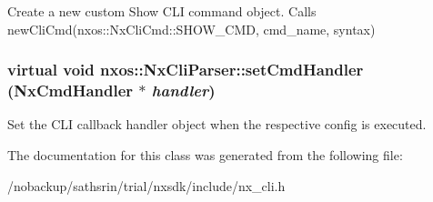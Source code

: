 \label{classnxos_1_1NxCliParser_ac07fa22d7d83d4c9015ea1f3976163d8}
Create a new custom Show CLI command object. Calls newCliCmd(nxos::NxCliCmd::SHOW\_\-CMD, cmd\_\-name, syntax) \hypertarget{classnxos_1_1NxCliParser_a711e36619a40625ebf62b59693529d88}{
\subsubsection[{setCmdHandler}]{\setlength{\rightskip}{0pt plus 5cm}virtual void nxos::NxCliParser::setCmdHandler ({\bf NxCmdHandler} $\ast$ {\em handler})}}
\label{classnxos_1_1NxCliParser_a711e36619a40625ebf62b59693529d88}
Set the CLI callback handler object when the respective config is executed. 

The documentation for this class was generated from the following file:\begin{DoxyCompactItemize}
\item 
/nobackup/sathsrin/trial/nxsdk/include/nx\_\-cli.h\end{DoxyCompactItemize}
